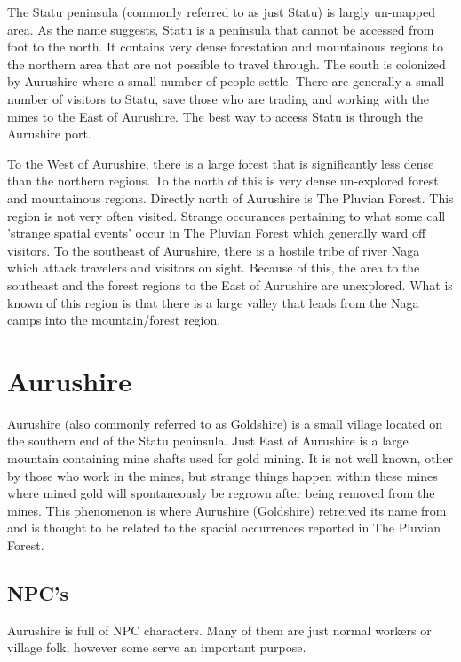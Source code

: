 \documentclass[letterpaper,10pt,twoside,twocolumn,openany]{book}
\begin{document}
The Statu peninsula (commonly referred to as just Statu) is largly un-mapped area. As the name suggests, Statu is a peninsula that cannot be accessed from foot to the north. It contains very dense forestation and mountainous regions to the northern area that are not possible to travel through. The south is colonized by Aurushire where a small number of people settle. There are generally a small number of visitors to Statu, save those who are trading and working with the mines to the East of Aurushire. The best way to access Statu is through the Aurushire port.

To the West of Aurushire, there is a large forest that is significantly less dense than the northern regions. To the north of this is very dense un-explored forest and mountainous regions. Directly north of Aurushire is The Pluvian Forest. This region is not very often visited. Strange occurances pertaining to what some call 'strange spatial events' occur in The Pluvian Forest which generally ward off visitors. To the southeast of Aurushire, there is a hostile tribe of river Naga which attack travelers and visitors on sight. Because of this, the area to the southeast and the forest regions to the East of Aurushire are unexplored. What is known of this region is that there is a large valley that leads from the Naga camps into the mountain/forest region.

\section{Aurushire}

Aurushire (also commonly referred to as Goldshire) is a small village located on the southern end of the Statu peninsula. Just East of Aurushire is a large mountain containing mine shafts used for gold mining. It is not well known, other by those who work in the mines, but strange things happen within these mines where mined gold will spontaneously be regrown after being removed from the mines. This phenomenon is where Aurushire (Goldshire) retreived its name from and is thought to be related to the spacial occurrences reported in The Pluvian Forest. 

\subsection{NPC's}

Aurushire is full of NPC characters. Many of them are just normal workers or village folk, however some serve an important purpose.
\end{document}
